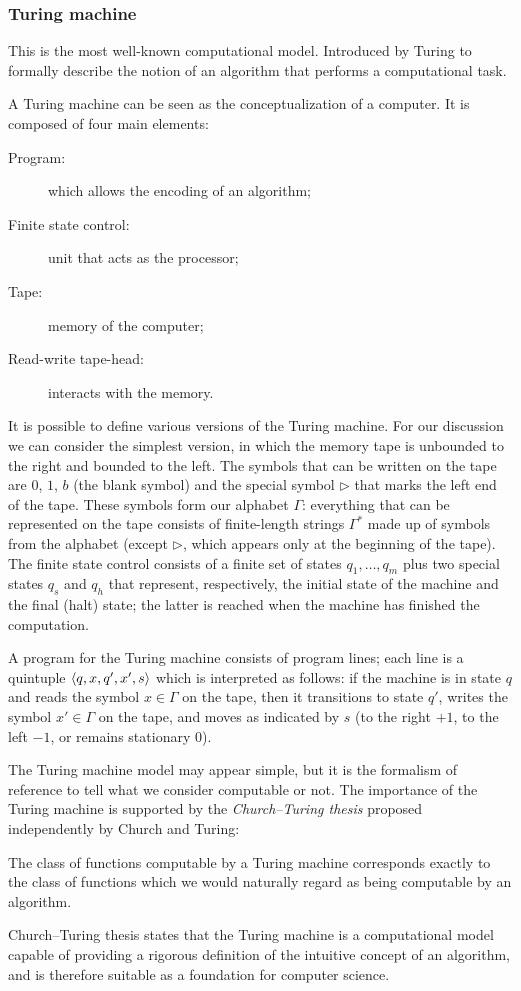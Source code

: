 \subsubsection*{Turing machine}
This is the most well-known computational model. Introduced by Turing to formally describe the notion of an algorithm that performs a computational task.

A Turing machine can be seen as the conceptualization of a computer. It is composed of four main elements:
\begin{description}
	\item[Program:] which allows the encoding of an algorithm;
	\item[Finite state control:]  unit that acts as the processor;
	\item[Tape:] memory of the computer;
	\item[Read-write tape-head:] interacts with the memory.
\end{description} 

It is possible to define various versions of the Turing machine. For our discussion we can consider the simplest version, in which the memory tape is unbounded to the right and bounded to the left. The symbols that can be written on the tape are $0$, $1$, $b$ (the blank symbol) and the special symbol $\triangleright$ that marks the left end of the tape. These symbols form our alphabet $\Gamma$: everything that can be represented on the tape consists of finite-length strings $\Gamma^*$ made up of symbols from the alphabet (except $\triangleright$, which appears only at the beginning of the tape). The finite state control consists of a finite set of states $q_1, \dots, q_m$ plus two special states $q_s$ and $q_h$ that represent, respectively, the initial state of the machine and the final (halt) state; the latter is reached when the machine has finished the computation. 

A program for the Turing machine consists of program lines; each line is a quintuple $\braket{q, x, q', x', s}$ which is interpreted as follows: if the machine is in state $q$ and reads the symbol $x \in \Gamma$ on the tape, then it transitions to state $q'$, writes the symbol $x' \in \Gamma$ on the tape, and moves as indicated by $s$ (to the right $+1$, to the left $-1$, or remains stationary $0$).

The Turing machine model may appear simple, but it is the formalism of reference to tell what we consider computable or not. The importance of the Turing machine is supported by the \emph{Church–Turing thesis} proposed independently by Church and Turing:
\begin{thesis}
	The class of functions computable by a Turing machine corresponds exactly to the class of functions which we would naturally regard as being computable by an algorithm.
\end{thesis}
Church–Turing thesis states that the Turing machine is a computational model capable of providing a rigorous definition of the intuitive concept of an algorithm, and is therefore suitable as a foundation for computer science.

